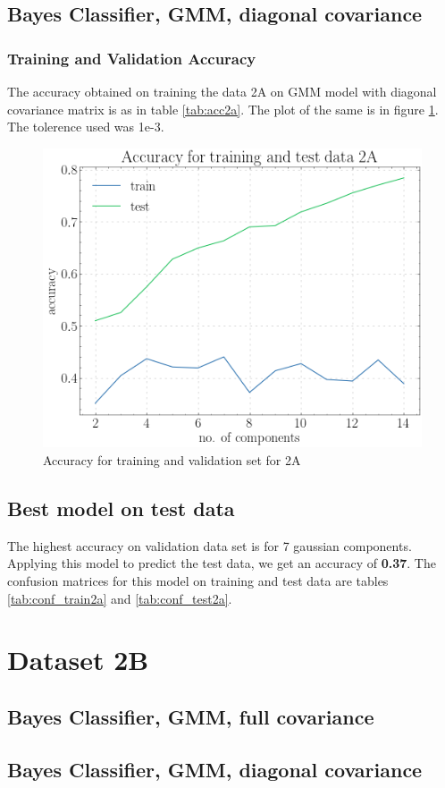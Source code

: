 \documentclass[11pt,a4paper]{article}
\begin{document}
\subsection{Bayes Classifier, GMM, diagonal covariance}
\subsubsection{Training and Validation Accuracy}
The accuracy obtained on training the data 2A on GMM model with diagonal covariance matrix is as in table \ref{tab:acc2a}. The plot of the same is in figure \ref{fig:acc2adiag}. The tolerence used was 1e-3.


\begin{figure}[H]
    \centering
    \includegraphics[scale = 0.5]{acc_2a.png}
    \caption{Accuracy for training and validation set for 2A}
    \label{fig:acc2adiag}
\end{figure}

\subsection{Best model on test data}
The highest accuracy on validation data set is for 7 gaussian components. Applying this model to predict the test data, we get an accuracy of \textbf{0.37}. The confusion matrices for this model on training and test data are tables \ref{tab:conf_train2a} and \ref{tab:conf_test2a}.


\break
\section{Dataset 2B}
\subsection{Bayes Classifier, GMM, full covariance}
\subsection{Bayes Classifier, GMM, diagonal covariance}
\end{document}
